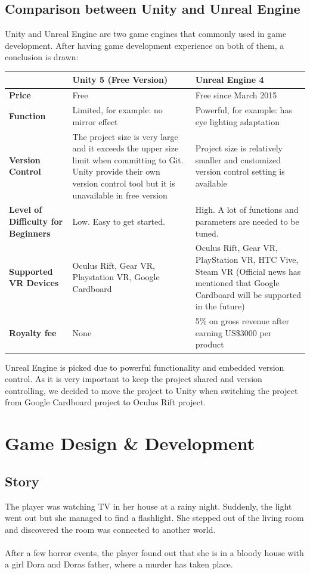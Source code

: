 \documentclass{article}
\begin{document}
\subsection{Comparison between Unity and Unreal Engine}
Unity and Unreal Engine are two game engines that commonly used in game development. After having game development experience on both of them, a conclusion is drawn: \smallskip
\begin{center}
\begin{tabular}{ | p{2cm} | p{6cm} | p{6cm} | }
 \hline
 & \textbf{Unity 5 (Free Version)} & \textbf{Unreal Engine 4} \\
 \hline
 \textbf{Price} & Free & Free since March 2015 \\
 \hline
 \textbf{Function} & Limited, for example: no mirror effect & Powerful, for example: has eye lighting adaptation \\
 \hline
  \textbf{Version Control} & The project size is very large and it exceeds the upper size limit when committing to Git. Unity provide their own version control tool but it is unavailable in free version & Project size is relatively smaller and customized version control setting is available \\
 \hline
 \textbf{Level of Difficulty for Beginners} & Low. Easy to get started. & High. A lot of functions and parameters are needed to be tuned. \\
 \hline
 \textbf{Supported VR Devices} & Oculus Rift, Gear VR, Playstation VR, Google Cardboard & Oculus Rift, Gear VR, PlayStation VR, HTC Vive, Steam VR (Official news has mentioned that Google Cardboard will be supported in the future) \\
 \hline
 \textbf{Royalty fee} & None & 5\% on gross revenue after earning US\$3000 per product\citep{royalty} \\
 \hline
\end{tabular}
\end{center}
\bigskip
Unreal Engine is picked due to powerful functionality and embedded version control. As it is very important to keep the project shared and version controlling, we decided to move the project to Unity when switching the project from Google Cardboard project to Oculus Rift project.
\newpage

\section{Game Design \& Development}
\subsection{Story}
The player was watching TV in her house at a rainy night. Suddenly, the light went out but she managed to find a flashlight. She stepped out of the living room and discovered the room was connected to another world.\\ \\
After a few horror events, the player found out that she is in a bloody house with a girl Dora and Dora\textsc{}s father, where a murder has taken place.\\
\end{document}
